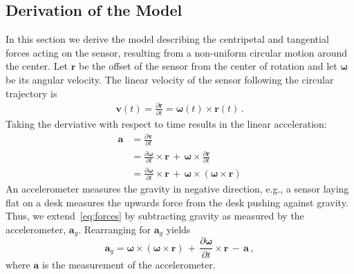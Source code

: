 \documentclass[journal]{IEEEtran}
\renewcommand{\vec}[1]{\boldsymbol{#1}}
\begin{document}
\subsection{Derivation of the Model}\label{ssec:derivation}
In this section we derive the model describing the centripetal and tangential
forces acting on the sensor, resulting from a non-uniform circular motion around the center. 
Let $\vec{r}$ be the offset of the sensor from the center of rotation and let
$\vec{\omega}$ be its angular velocity. The linear velocity of the sensor
following the circular trajectory is
\begin{align}
  \vec{v}(t) = \frac{\partial \vec{r}}{\partial t} = \vec{\omega}(t) \!\times\! \vec{r}(t) \, .
\end{align}
Taking the derviative with respect to time results in the linear acceleration:
\begin{align}
  \vec{a} & = \frac{\partial \vec{v}}{\partial t}                                                                                                              \\
          & = \frac{\partial \vec{\omega}}{\partial t} \!\times\! \vec{r} \, + \, \vec{\omega} \!\times\! \frac{\partial \vec{r}}{\partial t}                                                \\
          & = \frac{\partial \vec{\omega}}{\partial t} \!\times\! \vec{r} \, + \, \vec{\omega} \!\times\! \left( \vec{\omega} \!\times\! \vec{r} \right) \label{eq:forces}
\end{align}
An accelerometer measures the gravity in negative direction, e.g., a sensor laying flat on a desk measures the upwards force from the desk pushing against gravity.
Thus, we extend~\eqref{eq:forces} by subtracting gravity as measured by the accelerometer, $\vec{a}_g$.
Rearranging for $\vec{a}_g$ yields
\begin{equation}
  \vec{a}_g = \vec{\omega} \!\times\! \left( \vec{\omega} \!\times\! \vec{r} \right) \, + \, \frac{\partial \vec{\omega}}{\partial t} \!\times\! \vec{r} \, - \, \vec{a} \, ,
  \label{eq:compensation}
\end{equation}
where $\vec{a}$ is the measurement of the accelerometer.
\end{document}
